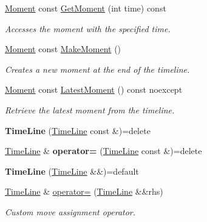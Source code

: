 \begin{DoxyCompactItemize}
\hyperlink{classtimeplane_1_1_moment}{Moment} const \hyperlink{classtimeplane_1_1_time_line_ae18ca86c0f036731e1bb148ed3381ea8}{Get\+Moment} (int time) const
\begin{DoxyCompactList}\small\item\em Accesses the moment with the specified time. \end{DoxyCompactList}\item 
\hyperlink{classtimeplane_1_1_moment}{Moment} const \hyperlink{classtimeplane_1_1_time_line_a7520362a8b33962371b1a47831b37b03}{Make\+Moment} ()
\begin{DoxyCompactList}\small\item\em Creates a new moment at the end of the timeline. \end{DoxyCompactList}\item 
\hyperlink{classtimeplane_1_1_moment}{Moment} const \hyperlink{classtimeplane_1_1_time_line_acc391553e5c45a647c82f27e53ae3af8}{Latest\+Moment} () const noexcept
\begin{DoxyCompactList}\small\item\em Retrieve the latest moment from the timeline. \end{DoxyCompactList}\item 
\mbox{\label{classtimeplane_1_1_time_line_abba50bd707ce998356abd59bbf302f94}} 
{\bfseries Time\+Line} (\hyperlink{classtimeplane_1_1_time_line}{Time\+Line} const \&)=delete
\item 
\mbox{\label{classtimeplane_1_1_time_line_ad8eb0c4a4c85e5d859fab5e1d70a757f}} 
\hyperlink{classtimeplane_1_1_time_line}{Time\+Line} \& {\bfseries operator=} (\hyperlink{classtimeplane_1_1_time_line}{Time\+Line} const \&)=delete
\item 
\mbox{\label{classtimeplane_1_1_time_line_a345833bfe7d67e2ca39067e92cb4929a}} 
{\bfseries Time\+Line} (\hyperlink{classtimeplane_1_1_time_line}{Time\+Line} \&\&)=default
\item 
\hyperlink{classtimeplane_1_1_time_line}{Time\+Line} \& \hyperlink{classtimeplane_1_1_time_line_a14e1d9701e1a6571458343e0831855b6}{operator=} (\hyperlink{classtimeplane_1_1_time_line}{Time\+Line} \&\&rhs)
\begin{DoxyCompactList}\small\item\em Custom move assignment operator. \end{DoxyCompactList}\end{DoxyCompactItemize}


